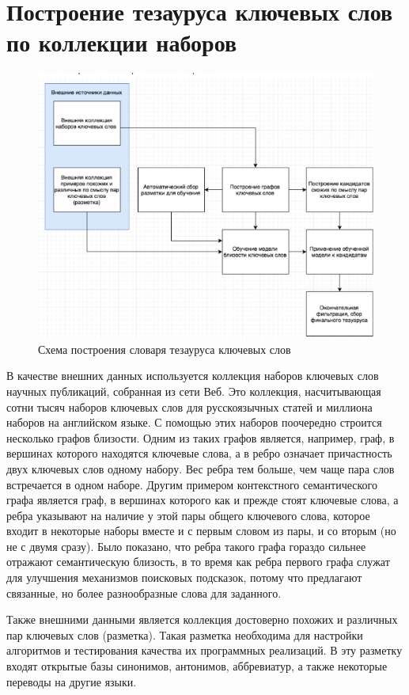 \section{Построение тезауруса ключевых слов по коллекции наборов} \label{thes}

\begin{figure}[ht]
  \begin{minipage}[ht]{1.0\linewidth}\centering
    \includegraphics[width=0.7\linewidth]{Dissertation/pics/thes}
    \caption{Схема построения словаря тезауруса ключевых слов}
  \end{minipage}
  \label{img:thes}
\end{figure}

В качестве внешних данных используется коллекция наборов ключевых слов научных публикаций, собранная из сети Веб. Это коллекция, насчитывающая сотни тысяч наборов ключевых слов для русскоязычных статей и миллиона наборов на английском языке. С помощью этих наборов поочередно строится несколько графов близости. Одним из таких графов является, например, граф, в вершинах которого находятся ключевые слова, а в ребро означает причастность двух ключевых слов одному набору. Вес ребра тем больше, чем чаще пара слов встречается в одном наборе. Другим примером контекстного семантического графа является граф, в вершинах которого как и прежде стоят ключевые слова, а ребра указывают на наличие у этой пары общего ключевого слова, которое входит в некоторые наборы вместе и с первым словом из пары, и со вторым (но не с двумя сразу). Было показано, что ребра такого графа гораздо сильнее отражают семантическую близость, в то время как ребра первого графа служат для улучшения механизмов поисковых подсказок, потому что предлагают связанные, но более разнообразные слова для заданного.

Также внешними данными является коллекция достоверно похожих и различных пар ключевых слов (разметка). Такая разметка необходима для настройки алгоритмов и тестирования качества их программных реализаций. В эту разметку входят открытые базы синонимов, антонимов, аббревиатур, а также некоторые переводы на другие языки.

